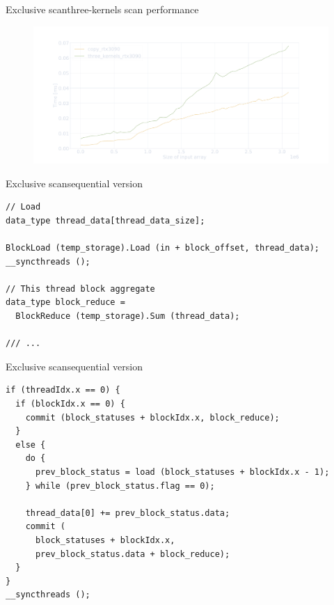 \documentclass[aspectratio=169,compress]{beamer}
\begin{document}
\begin{frame}[fragile]{Exclusive scan}{three-kernels scan performance}
\centering
	\begin{figure}
		\includegraphics[width=\textwidth]{three_kernel_scan_perf.pdf}
	\end{figure}
\end{frame}

\begin{frame}[fragile]{Exclusive scan}{sequential version}

\vspace{0.1in}

\begin{lstlisting}[showstringspaces=false]
// Load 
data_type thread_data[thread_data_size];

BlockLoad (temp_storage).Load (in + block_offset, thread_data);
__syncthreads ();

// This thread block aggregate
data_type block_reduce = 
  BlockReduce (temp_storage).Sum (thread_data);

/// ...
\end{lstlisting}
\end{frame}

\begin{frame}[fragile]{Exclusive scan}{sequential version}

\vspace{0.1in}

\begin{lstlisting}[showstringspaces=false]
if (threadIdx.x == 0) {
  if (blockIdx.x == 0) {
    commit (block_statuses + blockIdx.x, block_reduce);
  }
  else {
    do {
      prev_block_status = load (block_statuses + blockIdx.x - 1);
    } while (prev_block_status.flag == 0);

    thread_data[0] += prev_block_status.data;
    commit (
      block_statuses + blockIdx.x,
      prev_block_status.data + block_reduce);
  }
}
__syncthreads ();
\end{lstlisting}
\end{frame}
\end{document}
